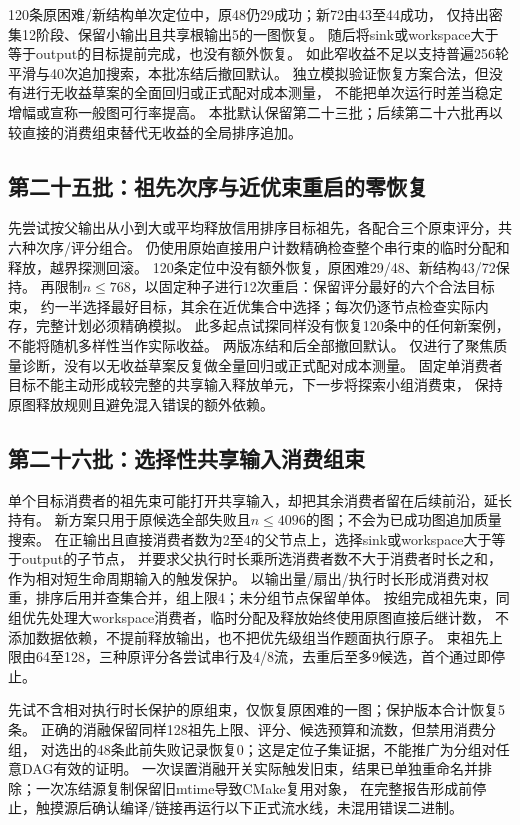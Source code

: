 \documentclass[UTF8,a4paper,11pt,fontset=fandol]{ctexart}
\begin{document}
120条原困难/新结构单次定位中，原48仍29成功；新72由43至44成功，
仅持出密集12阶段、保留小输出且共享根输出5的一图恢复。
随后将sink或workspace大于等于output的目标提前完成，也没有额外恢复。
如此窄收益不足以支持普遍256轮平滑与40次追加搜索，本批冻结后撤回默认。
独立模拟验证恢复方案合法，但没有进行无收益草案的全面回归或正式配对成本测量，
不能把单次运行时差当稳定增幅或宣称一般图可行率提高。
本批默认保留第二十三批；后续第二十六批再以较直接的消费组束替代无收益的全局排序追加。

\subsection{第二十五批：祖先次序与近优束重启的零恢复}
先尝试按父输出从小到大或平均释放信用排序目标祖先，各配合三个原束评分，共六种次序/评分组合。
仍使用原始直接用户计数精确检查整个串行束的临时分配和释放，越界探测回滚。
120条定位中没有额外恢复，原困难29/48、新结构43/72保持。
再限制$n\le768$，以固定种子进行12次重启：保留评分最好的六个合法目标束，
约一半选择最好目标，其余在近优集合中选择；每次仍逐节点检查实际内存，完整计划必须精确模拟。
此多起点试探同样没有恢复120条中的任何新案例，不能将随机多样性当作实际收益。
两版冻结和后全部撤回默认。
仅进行了聚焦质量诊断，没有以无收益草案反复做全量回归或正式配对成本测量。
固定单消费者目标不能主动形成较完整的共享输入释放单元，下一步将探索小组消费束，
保持原图释放规则且避免混入错误的额外依赖。

\subsection{第二十六批：选择性共享输入消费组束}
单个目标消费者的祖先束可能打开共享输入，却把其余消费者留在后续前沿，延长持有。
新方案只用于原候选全部失败且$n\le4096$的图；不会为已成功图追加质量搜索。
在正输出且直接消费者数为2至4的父节点上，选择sink或workspace大于等于output的子节点，
并要求父执行时长乘所选消费者数不大于消费者时长之和，作为相对短生命周期输入的触发保护。
以输出量/扇出/执行时长形成消费对权重，排序后用并查集合并，组上限4；未分组节点保留单体。
按组完成祖先束，同组优先处理大workspace消费者，临时分配及释放始终使用原图直接后继计数，
不添加数据依赖，不提前释放输出，也不把优先级组当作题面执行原子。
束祖先上限由64至128，三种原评分各尝试串行及4/8流，去重后至多9候选，首个通过即停止。

先试不含相对执行时长保护的原组束，仅恢复原困难的一图；保护版本合计恢复5条。
正确的消融保留同样128祖先上限、评分、候选预算和流数，但禁用消费分组，
对选出的48条此前失败记录恢复0；这是定位子集证据，不能推广为分组对任意DAG有效的证明。
一次误置消融开关实际触发旧束，结果已单独重命名并排除；一次冻结源复制保留旧mtime导致CMake复用对象，
在完整报告形成前停止，触摸源后确认编译/链接再运行以下正式流水线，未混用错误二进制。
\end{document}
